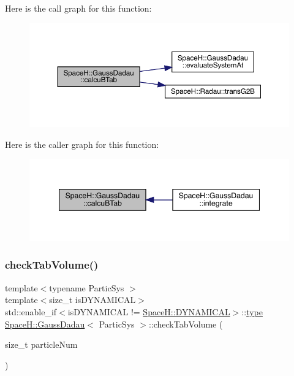Here is the call graph for this function\+:
\nopagebreak
\begin{figure}[H]
\begin{center}
\leavevmode
\includegraphics[width=350pt]{class_space_h_1_1_gauss_dadau_ac7089493b28c3c3ed67dc875e172b40c_cgraph}
\end{center}
\end{figure}
Here is the caller graph for this function\+:
\nopagebreak
\begin{figure}[H]
\begin{center}
\leavevmode
\includegraphics[width=347pt]{class_space_h_1_1_gauss_dadau_ac7089493b28c3c3ed67dc875e172b40c_icgraph}
\end{center}
\end{figure}
\mbox{\label{class_space_h_1_1_gauss_dadau_a0e5f1df629baf9e5dfdfa052544c68ff}} 
\subsubsection{\texorpdfstring{check\+Tab\+Volume()}{checkTabVolume()}\hspace{0.1cm}{\footnotesize\ttfamily [1/2]}}
{\footnotesize\ttfamily template$<$typename Partic\+Sys $>$ \\
template$<$size\+\_\+t is\+D\+Y\+N\+A\+M\+I\+C\+AL$>$ \\
std\+::enable\+\_\+if$<$is\+D\+Y\+N\+A\+M\+I\+C\+AL != \mbox{\hyperlink{namespace_space_h_a3e55b9bc2a9e10c08ce8121bce11244a}{Space\+H\+::\+D\+Y\+N\+A\+M\+I\+C\+AL}}$>$\+::\mbox{\hyperlink{class_space_h_1_1_gauss_dadau_a780629d19a82feeab959cd68c8a5f8a3}{type}} \mbox{\hyperlink{class_space_h_1_1_gauss_dadau}{Space\+H\+::\+Gauss\+Dadau}}$<$ Partic\+Sys $>$\+::check\+Tab\+Volume (\begin{DoxyParamCaption}\item[{size\+\_\+t}]{particle\+Num }\end{DoxyParamCaption})\hspace{0.3cm}{\ttfamily [inline]}}


